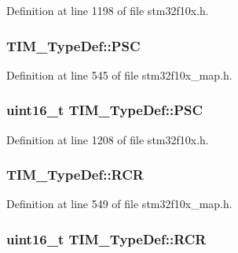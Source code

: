 Definition at line 1198 of file stm32f10x.\+h.

\subsubsection[{\texorpdfstring{P\+SC}{PSC}}]{ T\+I\+M\+\_\+\+Type\+Def\+::\+P\+SC}\hypertarget{struct_t_i_m___type_def_a495cd5d594339668f41abcc8fa57bd03}{}\label{struct_t_i_m___type_def_a495cd5d594339668f41abcc8fa57bd03}


Definition at line 545 of file stm32f10x\+\_\+map.\+h.

\subsubsection[{\texorpdfstring{P\+SC}{PSC}}]{ {\bf uint16\+\_\+t} T\+I\+M\+\_\+\+Type\+Def\+::\+P\+SC}\hypertarget{struct_t_i_m___type_def_ad58e05db30d309608402a69d87c36505}{}\label{struct_t_i_m___type_def_ad58e05db30d309608402a69d87c36505}


Definition at line 1208 of file stm32f10x.\+h.

\subsubsection[{\texorpdfstring{R\+CR}{RCR}}]{ T\+I\+M\+\_\+\+Type\+Def\+::\+R\+CR}\hypertarget{struct_t_i_m___type_def_aa081b81adb37c16bf4993caf9d74b2eb}{}\label{struct_t_i_m___type_def_aa081b81adb37c16bf4993caf9d74b2eb}


Definition at line 549 of file stm32f10x\+\_\+map.\+h.

\subsubsection[{\texorpdfstring{R\+CR}{RCR}}]{ {\bf uint16\+\_\+t} T\+I\+M\+\_\+\+Type\+Def\+::\+R\+CR}\hypertarget{struct_t_i_m___type_def_aa6957ece6ee709031ab5241d6019fcce}{}\label{struct_t_i_m___type_def_aa6957ece6ee709031ab5241d6019fcce}


